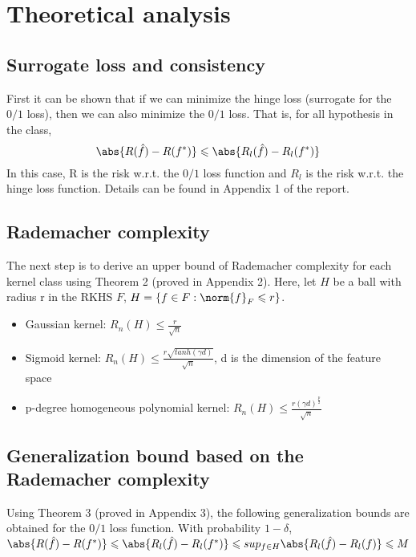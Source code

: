 \documentclass{article}
\begin{document}
\section{Theoretical analysis} 

\subsection{Surrogate loss and consistency}
First it can be shown that if we can minimize the hinge loss (surrogate for the $0/1$ loss), then we can also minimize the $0/1$ loss. That is, for all hypothesis in the class, $$\abs{R(\hat{f})-R(f^*)} \leqslant \abs{R_{l}(\hat{f})-R_{l}(f^*)}$$
In this case, R is the risk w.r.t. the $0/1$ loss function and $R_l$ is the risk w.r.t. the hinge loss function. Details can be found in Appendix 1 of the report.

\subsection{Rademacher complexity}
The next step is to derive an upper bound of Rademacher complexity for each kernel class using Theorem 2 (proved in Appendix 2). Here, let $H$ be a ball with radius r in the RKHS $F$, $H=\{f\in F: \norm{f}_F \leqslant r\}$.\\

\begin{itemize}
  \item Gaussian kernel: ${R}_n(H)\leqslant\frac{r}{\sqrt{n}}$
  \item Sigmoid kernel: ${R}_n(H)\leqslant\frac{r\sqrt{tanh(\gamma d)}}{\sqrt{n}}$, d is the dimension of the feature space
  \item p-degree homogeneous polynomial kernel: ${R}_n(H)\leqslant\frac{r(\gamma d)^\frac{p}{2}}{\sqrt{n}}$    
\end{itemize} 

\subsection{Generalization bound based on the Rademacher complexity}
Using Theorem 3 (proved in Appendix 3), the following generalization bounds are obtained for the $0/1$ loss function. With probability $1-\delta$, $\abs{R(\hat{f})-R(f^*)} \leqslant \abs{R_{l}(\hat{f})-R_{l}(f^*)} \leqslant sup_{f\in H}\abs{R_{l}(\hat{f})-R_{l}(f)} \leqslant M$ 
\end{document}
